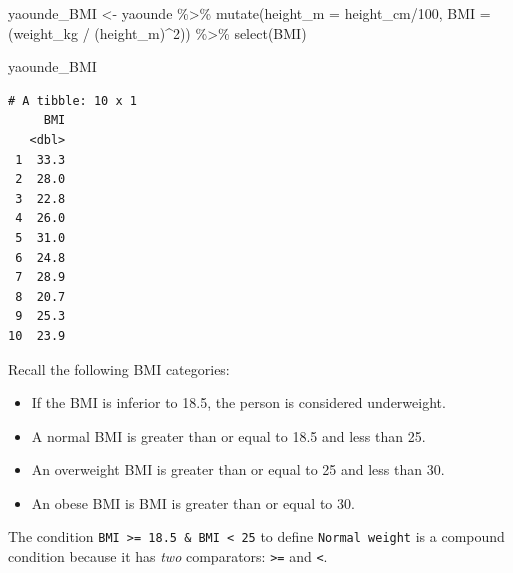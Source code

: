 \documentclass[
  letterpaper,
  DIV=11,
  numbers=noendperiod]{scrreprt}
\newenvironment{Shaded}{\begin{snugshade}}{\end{snugshade}}
\newcommand{\AttributeTok}[1]{\textcolor[rgb]{0.40,0.45,0.13}{#1}}
\newcommand{\DecValTok}[1]{\textcolor[rgb]{0.68,0.00,0.00}{#1}}
\newcommand{\FunctionTok}[1]{\textcolor[rgb]{0.28,0.35,0.67}{#1}}
\newcommand{\NormalTok}[1]{\textcolor[rgb]{0.00,0.23,0.31}{#1}}
\newcommand{\OtherTok}[1]{\textcolor[rgb]{0.00,0.23,0.31}{#1}}
\newcommand{\SpecialCharTok}[1]{\textcolor[rgb]{0.37,0.37,0.37}{#1}}
\begin{document}
\begin{Shaded}
\begin{Highlighting}[]
\NormalTok{yaounde\_BMI }\OtherTok{\textless{}{-}}
\NormalTok{  yaounde }\SpecialCharTok{\%\textgreater{}\%}
  \FunctionTok{mutate}\NormalTok{(}\AttributeTok{height\_m =}\NormalTok{ height\_cm}\SpecialCharTok{/}\DecValTok{100}\NormalTok{,}
         \AttributeTok{BMI =}\NormalTok{ (weight\_kg }\SpecialCharTok{/}\NormalTok{ (height\_m)}\SpecialCharTok{\^{}}\DecValTok{2}\NormalTok{)) }\SpecialCharTok{\%\textgreater{}\%}
  \FunctionTok{select}\NormalTok{(BMI)}

\NormalTok{yaounde\_BMI}
\end{Highlighting}
\end{Shaded}

\begin{verbatim}
# A tibble: 10 x 1
     BMI
   <dbl>
 1  33.3
 2  28.0
 3  22.8
 4  26.0
 5  31.0
 6  24.8
 7  28.9
 8  20.7
 9  25.3
10  23.9
\end{verbatim}

Recall the following BMI categories:

\begin{itemize}
\item
  If the BMI is inferior to 18.5, the person is considered underweight.
\item
  A normal BMI is greater than or equal to 18.5 and less than 25.
\item
  An overweight BMI is greater than or equal to 25 and less than 30.
\item
  An obese BMI is BMI is greater than or equal to 30.
\end{itemize}

The condition
\texttt{BMI\ \textgreater{}=\ 18.5\ \&\ BMI\ \textless{}\ 25} to define
\texttt{Normal\ weight} is a compound condition because it has
\emph{two} comparators: \texttt{\textgreater{}=} and
\texttt{\textless{}}.
\end{document}
